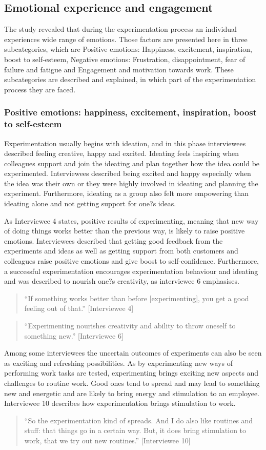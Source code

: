 \subsection{Emotional experience and engagement}
The study revealed that during the experimentation process an individual experiences wide range of emotions. Those factors are presented here in three subcategories, which are Positive emotions: Happiness, excitement, inspiration, boost to self-esteem, Negative emotions: Frustration, disappointment, fear of failure and fatigue and Engagement and motivation towards work. These subcategories are described and explained, in which part of the experimentation process they are faced. 

\subsubsection{Positive emotions: happiness, excitement, inspiration, boost to self-esteem}

Experimentation usually begins with ideation, and in this phase interviewees described feeling creative, happy and excited. Ideating feels inspiring when colleagues support and join the ideating and plan together how the idea could be experimented. Interviewees described being excited and happy especially when the idea was their own or they were highly involved in ideating and planning the experiment.  Furthermore, ideating as a group also felt more empowering than ideating alone and not getting support for one?s ideas. 

As Interviewee 4 states, positive results of experimenting, meaning that new way of doing things works better than the previous way, is likely to raise positive emotions. Interviewees described that getting good feedback from the experiments and ideas as well as getting support from both customers and colleagues raise positive emotions and give boost to self-confidence. Furthermore, a successful experimentation encourages experimentation behaviour and ideating and was described to nourish one?s creativity, as interviewee 6 emphasises.  
\begin{quote}
``If something works better than before [experimenting], you get a good feeling out of that.'' [Interviewee 4]
\end{quote}
\begin{quote}
``Experimenting nourishes creativity and ability to throw oneself to something new.'' [Interviewee 6]
\end{quote}
Among some interviewees the uncertain outcomes of experiments can also be seen as exciting and refreshing possibilities. As by experimenting new ways of performing work tasks are tested, experimenting brings exciting new aspects and challenges to routine work. Good ones tend to spread and may lead to something new and energetic and are likely to bring energy and stimulation to an employee. Interviewee 10 describes how experimentation brings stimulation to work. 
\begin{quote}
``So the experimentation kind of spreads. And I do also like routines and stuff: that things go in a certain way. But, it does bring stimulation to work, that we try out new routines.'' [Interviewee 10]
\end{quote}

